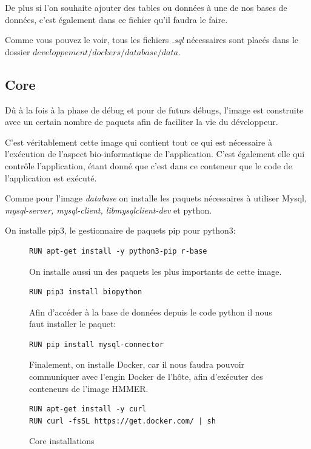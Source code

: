 De plus si l'on souhaite ajouter des tables ou données à une de nos bases de données, c'est également dans ce fichier qu'il faudra le faire.

Comme vous pouvez le voir, tous les fichiers \emph{.sql} nécessaires sont placés dans le dossier \emph{$developpement/dockers/database/data$}.


\subsection{Core}
Dû à la fois à la phase de débug et pour de futurs débugs, l'image est construite avec un certain nombre de paquets afin de faciliter la vie du développeur.

C'est véritablement cette image qui contient tout ce qui est nécessaire à l'exécution de l'aspect bio-informatique de l'application. C'est également elle qui contrôle l'application, étant donné que c’est dans ce conteneur que le code de l'application est exécuté.

Comme pour l'image \emph{database} on installe les paquets nécessaires à utiliser Mysql, \emph{mysql-server, mysql-client, libmysqlclient-dev} et python.

On installe pip3, le gestionnaire de paquets pip pour python3:

\begin{figure}[H] 
\centering 
\begin{lstlisting}[frame=single]
RUN apt-get install -y python3-pip r-base
\end{lstlisting}

On installe aussi un des paquets les plus importants de cette image.

\begin{lstlisting}[frame=single]
RUN pip3 install biopython
\end{lstlisting}

Afin d'accéder à la base de données depuis le code python il nous faut installer le paquet:

\begin{lstlisting}[frame=single]
RUN pip install mysql-connector
\end{lstlisting}

Finalement, on installe Docker, car il nous faudra pouvoir communiquer avec l'engin Docker de l'hôte, afin d'exécuter des conteneurs de l'image HMMER.

\begin{lstlisting}[frame=single]
RUN apt-get install -y curl
RUN curl -fsSL https://get.docker.com/ | sh
\end{lstlisting}
\caption[Core installations]{Core installations}
\label{fig:coreInstall} 
\end{figure}

